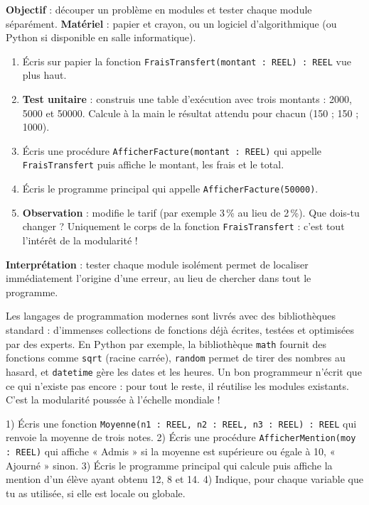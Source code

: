 \documentclass[11pt]{article}
\newcommand{\cle}[1]{{\popxbold\color{popdark}#1}}
\begin{document}
\begin{experience}
\textbf{Objectif} : découper un problème en modules et tester chaque module séparément. \textbf{Matériel} : papier et crayon, ou un logiciel d'algorithmique (ou Python si disponible en salle informatique).
\begin{enumerate}
  \item Écris sur papier la fonction \texttt{FraisTransfert(montant : REEL) : REEL} vue plus haut.
  \item \textbf{Test unitaire} : construis une table d'exécution avec trois montants : 2000, 5000 et 50000. Calcule à la main le résultat attendu pour chacun (150 ; 150 ; 1000).
  \item Écris une procédure \texttt{AfficherFacture(montant : REEL)} qui appelle \texttt{FraisTransfert} puis affiche le montant, les frais et le total.
  \item Écris le programme principal qui appelle \texttt{AfficherFacture(50000)}.
  \item \textbf{Observation} : modifie le tarif (par exemple 3\,\% au lieu de 2\,\%). Que dois-tu changer ? Uniquement le corps de la fonction \texttt{FraisTransfert} : c'est tout l'intérêt de la modularité !
\end{enumerate}
\textbf{Interprétation} : tester chaque module isolément permet de localiser immédiatement l'origine d'une erreur, au lieu de chercher dans tout le programme.
\end{experience}

\begin{savaistu}
Les langages de programmation modernes sont livrés avec des \cle{bibliothèques standard} : d'immenses collections de fonctions déjà écrites, testées et optimisées par des experts. En Python par exemple, la bibliothèque \texttt{math} fournit des fonctions comme \texttt{sqrt} (racine carrée), \texttt{random} permet de tirer des nombres au hasard, et \texttt{datetime} gère les dates et les heures. Un bon programmeur n'écrit que ce qui n'existe pas encore : pour tout le reste, il réutilise les modules existants. C'est la modularité poussée à l'échelle mondiale !
\end{savaistu}

\begin{exercice}
1) Écris une fonction \texttt{Moyenne(n1 : REEL, n2 : REEL, n3 : REEL) : REEL} qui renvoie la moyenne de trois notes. 2) Écris une procédure \texttt{AfficherMention(moy : REEL)} qui affiche « Admis » si la moyenne est supérieure ou égale à 10, « Ajourné » sinon. 3) Écris le programme principal qui calcule puis affiche la mention d'un élève ayant obtenu 12, 8 et 14. 4) Indique, pour chaque variable que tu as utilisée, si elle est locale ou globale.
\end{exercice}
\end{document}
